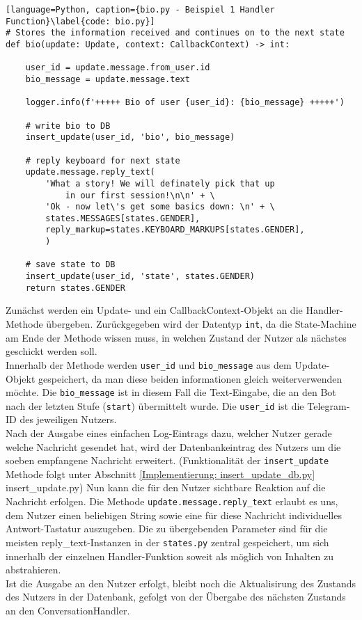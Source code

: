                 \begin{lstlisting}[language=Python, caption={bio.py - Beispiel 1 Handler Function}\label{code: bio.py}]
# Stores the information received and continues on to the next state
def bio(update: Update, context: CallbackContext) -> int:
    
    user_id = update.message.from_user.id
    bio_message = update.message.text
    
    logger.info(f'+++++ Bio of user {user_id}: {bio_message} +++++')

    # write bio to DB
    insert_update(user_id, 'bio', bio_message)

    # reply keyboard for next state
    update.message.reply_text(
        'What a story! We will definately pick that up 
            in our first session!\n\n' + \
        'Ok - now let\'s get some basics down: \n' + \
        states.MESSAGES[states.GENDER],
        reply_markup=states.KEYBOARD_MARKUPS[states.GENDER],
        )

    # save state to DB
    insert_update(user_id, 'state', states.GENDER)
    return states.GENDER
                    \end{lstlisting}

                Zunächst werden ein Update- und ein CallbackContext-Objekt an die Handler-Methode übergeben. Zurückgegeben wird der Datentyp \verb|int|, da die State-Machine am Ende der Methode wissen muss, in welchen Zustand der Nutzer als nächstes geschickt werden soll. \\
                Innerhalb der Methode werden \verb|user_id| und \verb|bio_message| aus dem Update-Objekt gespeichert, da man diese beiden informationen gleich weiterverwenden möchte. Die \verb|bio_message| ist in diesem Fall die Text-Eingabe, die an den Bot nach der letzten Stufe (\verb|start|) übermittelt wurde. Die \verb|user_id| ist die Telegram-ID des jeweiligen Nutzers. \\
                Nach der Ausgabe eines einfachen Log-Eintrags dazu, welcher Nutzer gerade welche Nachricht gesendet hat, wird der Datenbankeintrag des Nutzers um die soeben empfangene Nachricht erweitert. (Funktionalität der \verb|insert_update| Methode folgt unter Abschnitt \ref{Implementierung: insert_update_db.py} insert\_update.py)
                Nun kann die für den Nutzer sichtbare Reaktion auf die Nachricht erfolgen. Die Methode \verb|update.message.reply_text| erlaubt es uns, dem Nutzer einen beliebigen String sowie eine für diese Nachricht individuelles Antwort-Tastatur auszugeben. Die zu übergebenden Parameter sind für die meisten reply\_text-Instanzen in der \verb|states.py| zentral gespeichert, um sich innerhalb der einzelnen Handler-Funktion soweit als möglich von Inhalten zu abstrahieren.\\
                Ist die Ausgabe an den Nutzer erfolgt, bleibt noch die Aktualisirung des Zustands des Nutzers in der Datenbank, gefolgt von der Übergabe des nächsten Zustands an den ConversationHandler.

